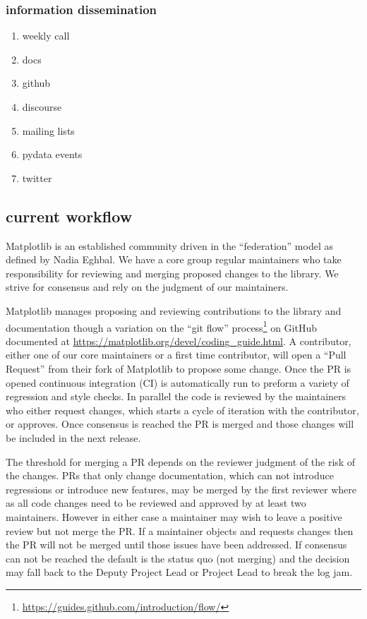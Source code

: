 \documentclass[12pt]{article}
\numberwithin{page}{section}
\begin{document}
\subsubsection{information dissemination}
\begin{enumerate}
\item weekly call
\item docs
\item github
\item discourse
\item mailing lists
\item pydata events
\item twitter
\end{enumerate}

\subsection{current workflow}

Matplotlib is an established community driven in the ``federation''
model as defined by Nadia Eghbal\cite{eghbal_2020}.  We have a core
group regular maintainers who take responsibility for reviewing and
merging proposed changes to the library.  We strive for consensus and
rely on the judgment of our maintainers.

Matplotlib manages proposing and reviewing contributions to the
library and documentation though a variation on the ``git flow''
process\footnote{\url{https://guides.github.com/introduction/flow/}}
on GitHub documented at
\url{https://matplotlib.org/devel/coding_guide.html}.  A contributor,
either one of our core maintainers or a first time contributor, will
open a ``Pull Request'' from their fork of Matplotlib to propose some
change.  Once the PR is opened continuous integration (CI) is
automatically run to preform a variety of regression and style checks.
In parallel the code is reviewed by the maintainers who either request
changes, which starts a cycle of iteration with the contributor, or
approves.  Once consensus is reached the PR is merged and those
changes will be included in the next release.

The threshold for merging a PR depends on the reviewer judgment of the
risk of the changes.  PRs that only change documentation, which can
not introduce regressions or introduce new features, may be merged by
the first reviewer where as all code changes need to be reviewed and
approved by at least two maintainers.  However in either case a
maintainer may wish to leave a positive review but not merge the PR.
If a maintainer objects and requests changes then the PR will not be
merged until those issues have been addressed.  If consensus can not
be reached the default is the status quo (not merging) and the
decision may fall back to the Deputy Project Lead or Project Lead to
break the log jam.
\end{document}
